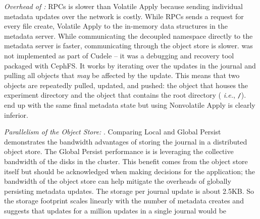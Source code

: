 {\it Overhead of :} RPCs is
\oldcomment{\(66\times\)}\newcomment{\(19.9\times\)} slower than Volatile Apply
because sending individual metadata updates over the network is costly.  While
RPCs sends a request for every file create, Volatile Apply  to the in-memory data structures in the metadata server. While
communicating the decoupled namespace directly to the metadata server
 is faster, communicating through the object
store  is
\oldcomment{\(10\times\)}\newcomment{\(78\times\)} slower.  
was not implemented as part of Cudele -- it was a debugging and recovery tool
packaged with CephFS. It works by iterating over the updates in the journal and
pulling all objects that {\it may} be affected by the update.  This means that
two objects are repeatedly pulled, updated, and pushed: the object that houses
the experiment directory and the object that contains the root directory ({\it
i.e.}, \texttt{/}).   
end up with the same final metadata state but using Nonvolatile Apply is
clearly inferior.

{\it Parallelism of the Object Store:}
.  Comparing Local and
Global Persist demonstrates the bandwidth advantages of storing the journal in
a distributed object store. The Global Persist performance is  is
leveraging the collective bandwidth of the disks in the cluster. This benefit
comes from the object store itself but should be acknowledged when making
decisions for the application; the bandwidth of the object store can help
mitigate the overheads of globally persisting metadata updates. The storage per
journal update is about 2.5KB. So the storage footprint scales linearly with
the number of metadata creates and suggests that updates for a million updates
in a single journal would be 

